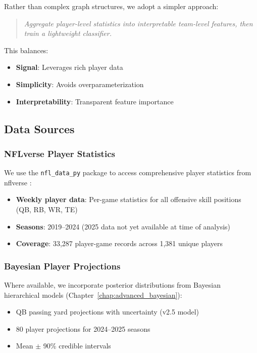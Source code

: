 Rather than complex graph structures, we adopt a simpler approach:

\begin{quote}
\textit{Aggregate player-level statistics into interpretable team-level features, then train a lightweight classifier.}
\end{quote}

This balances:
\begin{itemize}
    \item \textbf{Signal}: Leverages rich player data
    \item \textbf{Simplicity}: Avoids overparameterization
    \item \textbf{Interpretability}: Transparent feature importance
\end{itemize}

\subsection{Data Sources}

\subsubsection{NFLverse Player Statistics}

We use the \texttt{nfl\_data\_py} package to access comprehensive player statistics from nflverse \citep{nflverse2023}:

\begin{itemize}
    \item \textbf{Weekly player data}: Per-game statistics for all offensive skill positions (QB, RB, WR, TE)
    \item \textbf{Seasons}: 2019--2024 (2025 data not yet available at time of analysis)
    \item \textbf{Coverage}: 33,287 player-game records across 1,381 unique players
\end{itemize}

\subsubsection{Bayesian Player Projections}

Where available, we incorporate posterior distributions from Bayesian hierarchical models (Chapter~\ref{chap:advanced_bayesian}):

\begin{itemize}
    \item QB passing yard projections with uncertainty (v2.5 model)
    \item 80 player projections for 2024--2025 seasons
    \item Mean $\pm$ 90\% credible intervals
\end{itemize}

